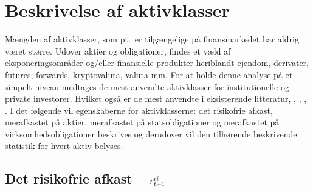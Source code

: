 \documentclass[
  a4paper,
  oneside]{memoir}
\begin{document}
\hypertarget{aktivklasser}{%
\section{Beskrivelse af aktivklasser}\label{aktivklasser}}

Mængden af aktivklasser, som pt.~er tilgængelige på finansmarkedet har aldrig været større. Udover aktier og obligationer, findes et væld af eksponeringsområder og/eller finansielle produkter heriblandt ejendom, derivater, futures, forwards, kryptovaluta, valuta mm. For at holde denne analyse på et simpelt niveau medtages de mest anvendte aktivklasser for institutionelle og private investorer. Hvilket også er de mest anvendte i eksisterende litteratur, \citep{CampVic2003, CampVic1999}, \citep{JurVic2011}, \citep{Engsted2012}, \citep{CampVicCha2003}. I det følgende vil egenskaberne for aktivklasserne: det risikofrie afkast, merafkastet på aktier, merafkastet på statsobligationer og merafkastet på virksomhedsobligationer beskrives og derudover vil den tilhørende beskrivende statistik for hvert aktiv belyses.

\hypertarget{det-risikofrie-afkast-r_t1textnormalrf}{%
\subsection{\texorpdfstring{Det risikofrie afkast -- \(r_{t+1}^{\textnormal{rf}}\)}{Det risikofrie afkast -- r\_\{t+1\}\^{}\{\textbackslash textnormal\{rf\}\}}}\label{det-risikofrie-afkast-r_t1textnormalrf}}
\end{document}
